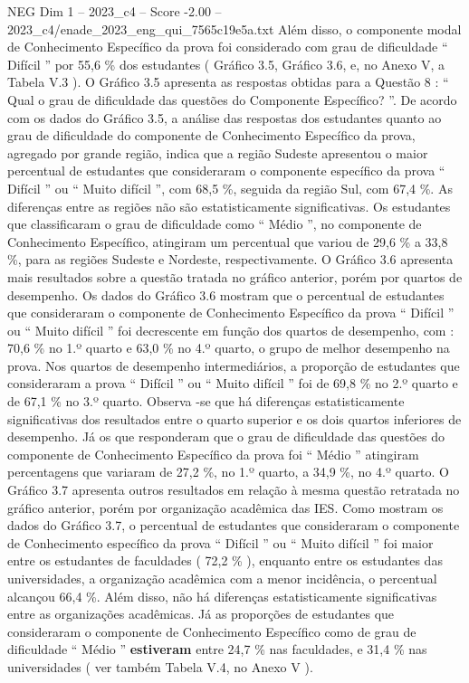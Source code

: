 \begin{textsample}{NEG Dim 1 – 2023\_c4 – Score -2.00 – 2023\_c4/enade\_2023\_eng\_qui\_7565c19e5a.txt}
Além disso, o componente modal de Conhecimento Específico da prova foi considerado com grau de dificuldade “ Difícil ” por 55,6 \% dos estudantes ( Gráfico 3.5, Gráfico 3.6, e, no Anexo V, a Tabela V.3 ).
O Gráfico 3.5 apresenta as respostas obtidas para a Questão 8 : “ Qual o grau de dificuldade das questões do Componente Específico? ”.
De acordo com os dados do Gráfico 3.5, a análise das respostas dos estudantes quanto ao grau de dificuldade do componente de Conhecimento Específico da prova, agregado por grande região, indica que a região Sudeste apresentou o maior percentual de estudantes que consideraram o componente específico da prova “ Difícil ” ou “ Muito difícil ”, com 68,5 \%, seguida da região Sul, com 67,4 \%.
As diferenças entre as regiões não são estatisticamente significativas.
Os estudantes que classificaram o grau de dificuldade como “ Médio ”, no componente de Conhecimento Específico, atingiram um percentual que variou de 29,6 \% a 33,8 \%, para as regiões Sudeste e Nordeste, respectivamente.
O Gráfico 3.6 apresenta mais resultados sobre a questão tratada no gráfico anterior, porém por quartos de desempenho.
Os dados do Gráfico 3.6 mostram que o percentual de estudantes que consideraram o componente de Conhecimento Específico da prova “ Difícil ” ou “ Muito difícil ” foi decrescente em função dos quartos de desempenho, com : 70,6 \% no 1.º quarto e 63,0 \% no 4.º quarto, o grupo de melhor desempenho na prova.
Nos quartos de desempenho intermediários, a proporção de estudantes que consideraram a prova “ Difícil ” ou “ Muito difícil ” foi de 69,8 \% no 2.º quarto e de 67,1 \% no 3.º quarto.
Observa -se que há diferenças estatisticamente significativas dos resultados entre o quarto superior e os dois quartos inferiores de desempenho.
Já os que responderam que o grau de dificuldade das questões do componente de Conhecimento Específico da prova foi “ Médio ” atingiram percentagens que variaram de 27,2 \%, no 1.º quarto, a 34,9 \%, no 4.º quarto.
O Gráfico 3.7 apresenta outros resultados em relação à mesma questão retratada no gráfico anterior, porém por organização acadêmica das IES.
Como mostram os dados do Gráfico 3.7, o percentual de estudantes que consideraram o componente de Conhecimento específico da prova “ Difícil ” ou “ Muito difícil ” foi maior entre os estudantes de faculdades ( 72,2 \% ), enquanto entre os estudantes das universidades, a organização acadêmica com a menor incidência, o percentual alcançou 66,4 \%.
Além disso, não há diferenças estatisticamente significativas entre as organizações acadêmicas.
Já as proporções de estudantes que consideraram o componente de Conhecimento Específico como de grau de dificuldade “ Médio ” \textbf{estiveram} entre 24,7 \% nas faculdades, e 31,4 \% nas universidades ( ver também Tabela V.4, no Anexo V ).

\end{textsample}
